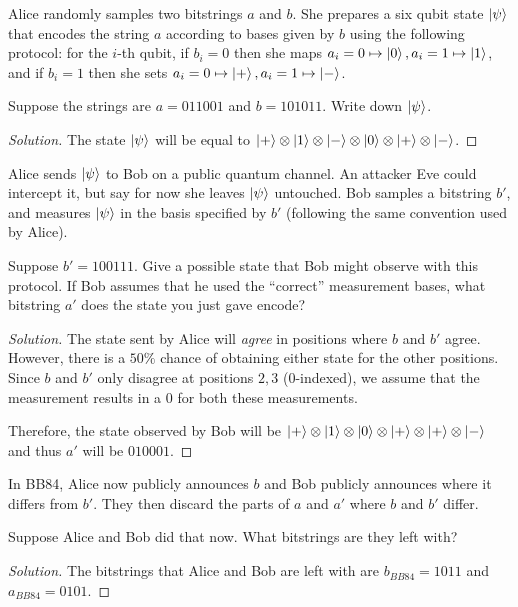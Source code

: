 \begin{solution}[label=ques:3a]
  \begin{question}
    Alice randomly samples two bitstrings $a$ and $b$. She prepares a six qubit state $\ket{\psi}$ that encodes the string $a$ according to bases given by $b$ using the following protocol: for the $i$-th qubit, if $b_i = 0$ then she maps $a_i=0\mapsto\ket{0},a_i=1\mapsto\ket{1}$, and if $b_i = 1$ then she sets $a_i=0\mapsto\ket{+},a_i=1\mapsto\ket{-}$.

Suppose the strings are $a = 011001$ and $b = 101011$. Write down $\ket{\psi}$.
  \end{question}
  \tcblower{}
  \begin{proof}[Solution]
    The state $\ket{\psi}$ will be equal to $\ket{+}\otimes\ket{1}\otimes\ket{-}\otimes\ket{0}\otimes\ket{+}\otimes\ket{-}$.
  \end{proof}
\end{solution}

\begin{solution}[label=ques:3b]
  \begin{question}
    Alice sends $\ket{\psi}$ to Bob on a public quantum channel. An attacker Eve could intercept it, but say for now she leaves $\ket{\psi}$ untouched. Bob samples a bitstring $b'$, and measures $\ket{\psi}$ in the basis specified by $b'$ (following the same convention used by Alice).

Suppose $b'=100111$. Give a possible state that Bob might observe with this protocol. 
If Bob assumes that he used the ``correct'' measurement bases, what bitstring $a'$ does the state you just gave encode?
  \end{question}
  \tcblower{}
  \begin{proof}[Solution]
    The state sent by Alice will \textit{agree} in positions where $b$ and $b'$ agree. However, there is a $50\%$ chance of obtaining either state for the other positions. Since $b$ and $b'$ only disagree at positions $2, 3$ ($0$-indexed), we assume that the measurement results in a $0$ for both these measurements.\par
    Therefore, the state observed by Bob will be $\ket{+}\otimes\ket{1}\otimes\ket{0}\otimes\ket{+}\otimes\ket{+}\otimes\ket{-}$ and thus $a'$ will be $010001$.
  \end{proof}
\end{solution}

\begin{solution}[label=ques:3c]
  \begin{question}
    In BB84, Alice now publicly announces $b$ and Bob publicly announces where it differs from $b'$. They then discard the parts of $a$ and $a'$ where $b$ and $b'$ differ. 

Suppose Alice and Bob did that now. What bitstrings are they left with?
  \end{question}
  \tcblower{}
  \begin{proof}[Solution]
    The bitstrings that Alice and Bob are left with are $b_{BB84} = 1011$ and $a_{BB84} = 0101$.
  \end{proof}
\end{solution}

